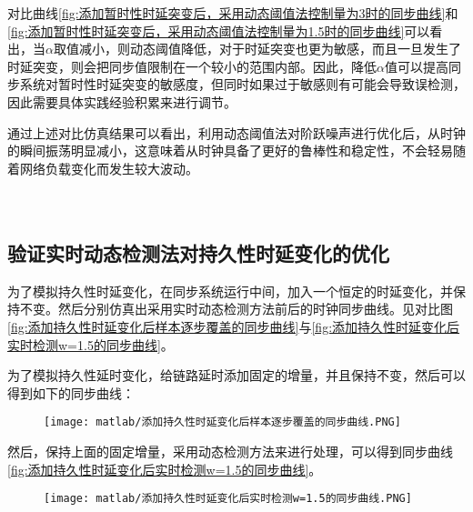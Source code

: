 对比曲线\ref{fig:添加暂时性时延突变后，采用动态阈值法控制量为3时的同步曲线}和\ref{fig:添加暂时性时延突变后，采用动态阈值法控制量为1.5时的同步曲线}可以看出，当$\alpha$取值减小，则动态阈值降低，对于时延突变也更为敏感，而且一旦发生了时延突变，则会把同步值限制在一个较小的范围内部。因此，降低$\alpha$值可以提高同步系统对暂时性时延突变的敏感度，但同时如果过于敏感则有可能会导致误检测，因此需要具体实践经验积累来进行调节。

通过上述对比仿真结果可以看出，利用动态阈值法对阶跃噪声进行优化后，从时钟的瞬间振荡明显减小，这意味着从时钟具备了更好的鲁棒性和稳定性，不会轻易随着网络负载变化而发生较大波动。
\\
\\
\\
\subsection{验证实时动态检测法对持久性时延变化的优化}
为了模拟持久性时延变化，在同步系统运行中间，加入一个恒定的时延变化，并保持不变。然后分别仿真出采用实时动态检测方法前后的时钟同步曲线。见对比图\ref{fig:添加持久性时延变化后样本逐步覆盖的同步曲线}与\ref{fig:添加持久性时延变化后实时检测w=1.5的同步曲线}。

为了模拟持久性延时变化，给链路延时添加固定的增量，并且保持不变，然后可以得到如下的同步曲线：

\begin{figure}[!hbp]
  \centering
  \begin{minipage}[b]{1\textwidth}
    \captionstyle{\centering}
    \centering
    \texttt{[image: matlab/添加持久性时延变化后样本逐步覆盖的同步曲线.PNG]}
  \end{minipage}     
\end{figure}

然后，保持上面的固定增量，采用动态检测方法来进行处理，可以得到同步曲线\ref{fig:添加持久性时延变化后实时检测w=1.5的同步曲线}。

\begin{figure}[htbp]
  \centering
  \begin{minipage}[b]{1\textwidth}
    \captionstyle{\centering}
    \centering
    \texttt{[image: matlab/添加持久性时延变化后实时检测w=1.5的同步曲线.PNG]}
  \end{minipage}     
\end{figure}

